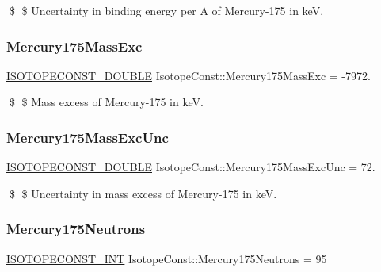 \$ \$ Uncertainty in binding energy per A of Mercury-\/175 in keV. \mbox{\label{group___isotope_const-_mercury-_hg175_gae8ce7aa85851d7ccad200cb4e36c304b}} 
\subsubsection{\texorpdfstring{Mercury175\+Mass\+Exc}{Mercury175MassExc}}
{\footnotesize\ttfamily \mbox{\hyperlink{group___isotope_const-_macros_ga8f45a7272ce02c0b4c65c44636ed719a}{I\+S\+O\+T\+O\+P\+E\+C\+O\+N\+S\+T\+\_\+\+D\+O\+U\+B\+LE}} Isotope\+Const\+::\+Mercury175\+Mass\+Exc = -\/7972.}

\$ \$ Mass excess of Mercury-\/175 in keV. \mbox{\label{group___isotope_const-_mercury-_hg175_ga8499363e9d65eec051f52adea92954b3}} 
\subsubsection{\texorpdfstring{Mercury175\+Mass\+Exc\+Unc}{Mercury175MassExcUnc}}
{\footnotesize\ttfamily \mbox{\hyperlink{group___isotope_const-_macros_ga8f45a7272ce02c0b4c65c44636ed719a}{I\+S\+O\+T\+O\+P\+E\+C\+O\+N\+S\+T\+\_\+\+D\+O\+U\+B\+LE}} Isotope\+Const\+::\+Mercury175\+Mass\+Exc\+Unc = 72.}

\$ \$ Uncertainty in mass excess of Mercury-\/175 in keV. \mbox{\label{group___isotope_const-_mercury-_hg175_ga2373d2c730c026148d1260cc7efb0136}} 
\subsubsection{\texorpdfstring{Mercury175\+Neutrons}{Mercury175Neutrons}}
{\footnotesize\ttfamily \mbox{\hyperlink{group___isotope_const-_macros_ga5f18360b3e99483a35c32d789e62621c}{I\+S\+O\+T\+O\+P\+E\+C\+O\+N\+S\+T\+\_\+\+I\+NT}} Isotope\+Const\+::\+Mercury175\+Neutrons = 95}

